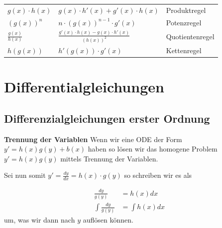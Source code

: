 \documentclass[25pt]{sciposter}
\newenvironment{method}[1]{\begin{mdframed}[backgroundcolor=blue!10,innertopmargin=15pt, innerbottommargin=15pt, nobreak=true]
		\textbf{#1 }
	}
	{ 
	\end{mdframed}
}
\begin{document}
\begin{multicols}{3}
{\begin{table}[]
\begin{tabular}{@{} p{} p{} p{} @{}}
			\midrule
			$g(x) \cdot h(x)$ & $g(x) \cdot h'(x) + g'(x) \cdot h(x)$ & Produktregel\\
			$\left(g(x)\right)^n$ & $n \cdot \left( g(x) \right)^{n-1} \cdot g'(x)$ & Potenzregel\\
			$\frac{g(x)}{h(x)}$ & $\frac{ g'(x) \cdot h(x) - g(x)\cdot h'(x)}{\left(h(x)\right) ^2}$ & Quotientenregel\\
			$h(g(x))$ & $h'(g(x)) \cdot g'(x)$ & Kettenregel\\
			\bottomrule
		\end{tabular}
	\end{table}
}








\section*{Differentialgleichungen}







\subsection*{Differenzialgleichungen erster Ordnung}


\begin{method}{Trennung der Variablen} Wenn wir eine ODE der Form $y' = h(x)g(y) + b(x)$ haben so lösen wir das homogene Problem $y' = h(x)g(y)$ mittels Trennung der Variablen.
	
Sei nun somit $y' = \frac{dy}{dx} = h(x)\cdot g(y)$ so schreiben wir es als 

\begin{align*}
	\frac{dy}{g(y)} &= h(x)dx\\
	\int \frac{dy}{g(y)} &= \int h(x)dx
\end{align*}
um, was wir dann nach $y$ auflösen können.
\end{method}





\end{multicols}
\end{document}
